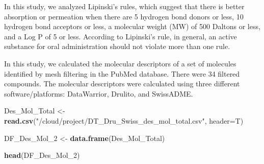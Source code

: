 \documentclass[
]{article}
\newenvironment{Shaded}{\begin{snugshade}}{\end{snugshade}}
\newcommand{\AttributeTok}[1]{\textcolor[rgb]{0.13,0.29,0.53}{#1}}
\newcommand{\FunctionTok}[1]{\textcolor[rgb]{0.13,0.29,0.53}{\textbf{#1}}}
\newcommand{\NormalTok}[1]{#1}
\newcommand{\OtherTok}[1]{\textcolor[rgb]{0.56,0.35,0.01}{#1}}
\newcommand{\StringTok}[1]{\textcolor[rgb]{0.31,0.60,0.02}{#1}}
\begin{document}
In this study, we analyzed Lipinski's rules, which suggest that there is
better absorption or permeation when there are 5 hydrogen bond donors or
less, 10 hydrogen bond acceptors or less, a molecular weight (MW) of 500
Daltons or less, and a Log P of 5 or less. According to Lipinski's rule,
in general, an active substance for oral administration should not
violate more than one rule.

In this study, we calculated the molecular descriptors of a set of
molecules identified by mesh filtering in the PubMed database. There
were 34 filtered compounds. The molecular descriptors were calculated
using three different software/platforms: DataWarrior, Drulito, and
SwissADME.

\begin{Shaded}
\begin{Highlighting}[]
\NormalTok{Des\_Mol\_Total }\OtherTok{\textless{}{-}} \FunctionTok{read.csv}\NormalTok{(}\StringTok{"/cloud/project/DT\_Dru\_Swiss\_des\_mol\_total.csv"}\NormalTok{, }\AttributeTok{header=}\NormalTok{T)}


\NormalTok{DF\_Des\_Mol\_2 }\OtherTok{\textless{}{-}} \FunctionTok{data.frame}\NormalTok{(Des\_Mol\_Total)}


\FunctionTok{head}\NormalTok{(DF\_Des\_Mol\_2)}
\end{Highlighting}
\end{Shaded}
\end{document}
